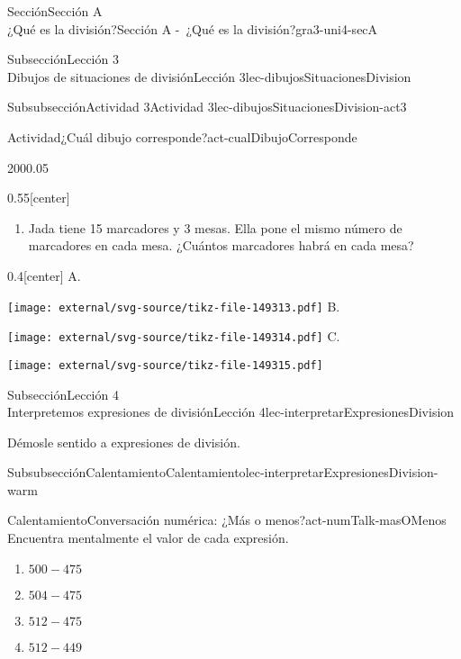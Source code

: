 \begin{sectionptx}{Sección}{{\Large Sección A\\}¿Qué es la división?}{}{Sección A -~¿Qué es la división?}{}{}{gra3-uni4-secA}
\begin{subsectionptx}{Subsección}{{\normalsize Lección 3\\[-0.05cm]}Dibujos de situaciones de división}{}{Lección 3}{}{}{lec-dibujosSituacionesDivision}
\begin{subsubsectionptx}{Subsubsección}{Actividad 3}{}{Actividad 3}{}{}{lec-dibujosSituacionesDivision-act3}
\begin{activity}{Actividad}{¿Cuál dibujo corresponde?}{act-cualDibujoCorresponde}
\begin{sidebyside}{2}{0}{0}{0.05}
\begin{sbspanel}{0.55}[center]
\begin{enumerate}
\item{}Jada tiene 15 marcadores y 3 mesas. Ella pone el mismo número de marcadores en cada mesa. ¿Cuántos marcadores habrá en cada mesa?%
\end{enumerate}
\end{sbspanel}%
\begin{sbspanel}{0.4}[center]%
A.%
\par
\texttt{[image: external/svg-source/tikz-file-149313.pdf]}
B.%
\par
\texttt{[image: external/svg-source/tikz-file-149314.pdf]}
C.%
\par
\texttt{[image: external/svg-source/tikz-file-149315.pdf]}
\end{sbspanel}%
\end{sidebyside}%
\end{activity}%
\end{subsubsectionptx}
\end{subsectionptx}
%
%
\typeout{************************************************}
\typeout{************************************************}
%
\clearpage
\begin{subsectionptx}{Subsección}{{\normalsize Lección 4\\[-0.05cm]}Interpretemos expresiones de división}{}{Lección 4}{}{}{lec-interpretarExpresionesDivision}
\begin{introduction}{}%
Démosle sentido a expresiones de división.%
\end{introduction}%
%
%
\typeout{************************************************}
\typeout{************************************************}
%
\begin{subsubsectionptx}{Subsubsección}{Calentamiento}{}{Calentamiento}{}{}{lec-interpretarExpresionesDivision-warm}
\begin{exploration}{Calentamiento}{Conversación numérica: ¿Más o menos?}{act-numTalk-masOMenos}%
Encuentra mentalmente el valor de cada expresión.%
%
\begin{enumerate}[label={\Alph*.}]
\item{}\(\displaystyle 500 - 475\)%
\item{}\(\displaystyle 504 - 475\)%
\item{}\(\displaystyle 512 - 475\)%
\item{}\(\displaystyle 512 - 449\)%
\end{enumerate}

\end{exploration}
\end{subsubsectionptx}
\end{subsectionptx}
\end{sectionptx}
